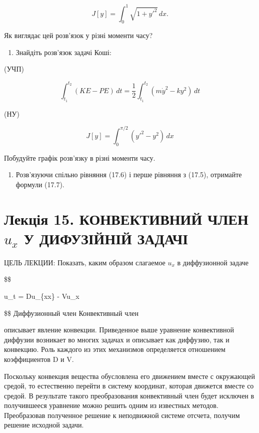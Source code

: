 \[
J[y] = \int_{0}^{1} \sqrt{1 + y'^{2}}\,dx.
\]

Як виглядає цей розв'язок у різні моменти часу?

\begin{enumerate}
\def\labelenumi{\arabic{enumi}.}
\setcounter{enumi}{3}
\tightlist
\item
  Знайдіть розв'язок задачі Коші:
\end{enumerate}

(УЧП)

\[
\int_{t_{1}}^{t_{2}} (KE - PE)\,dt = \frac{1}{2} \int_{t_{1}}^{t_{2}} (m\dot{y}^{2} - ky^{2})\,dt
\]

(НУ)

\[
J[y] = \int_{0}^{\pi/2} (y'^{2} - y^{2})\,dx
\]

Побудуйте графік розв'язку в різні моменти часу.

\begin{enumerate}
\def\labelenumi{\arabic{enumi}.}
\setcounter{enumi}{4}
\tightlist
\item
  Розв'язуючи спільно рівняння (17.6) і перше рівняння з (17.5), отримайте формули (17.7).
\end{enumerate}

\section{\texorpdfstring{Лекція 15. КОНВЕКТИВНИЙ ЧЛЕН \(u_x\) У ДИФУЗІЙНІЙ ЗАДАЧІ}{Лекція 15. КОНВЕКТИВНИЙ ЧЛЕН u\_x У ДИФУЗІЙНІЙ ЗАДАЧІ}}\label{ux43bux435ux43aux446ux456ux44f-15.-ux43aux43eux43dux432ux435ux43aux442ux438ux432ux43dux438ux439-ux447ux43bux435ux43d-u_x-ux443-ux434ux438ux444ux443ux437ux456ux439ux43dux456ux439-ux437ux430ux434ux430ux447ux456}

ЦЕЛЬ ЛЕКЦИИ: Показать, каким образом слагаемое \(u_x\) в диффузионной задаче

\$\$

u\_t = Du\_\{xx\} - Vu\_x

\$\$ Диффузионный член Конвективный член

описывает явление конвекции. Приведенное выше уравнение конвективной диффузии возникает во многих задачах и описывает как диффузию, так и конвекцию. Роль каждого из этих механизмов определяется отношением коэффициентов D и V.

Поскольку конвекция вещества обусловлена его движением вместе с окружающей средой, то естественно перейти в систему координат, которая движется вместе со средой. В результате такого преобразования конвективный член будет исключен в получившееся уравнение можно решить одним из известных методов. Преобразовав полученное решение к неподвижной системе отсчета, получим решение исходной задачи.

